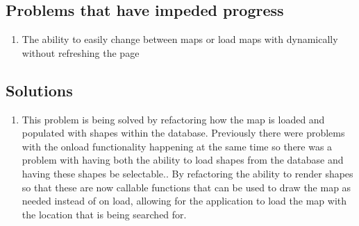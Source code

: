 \documentclass[letterpaper,10pt,titlepage, onecolumn, compsoc]{IEEEtran}
\begin{document}
\subsection{Problems that have impeded progress}
\begin{enumerate}
	\item The ability to easily change between maps or load maps with dynamically without refreshing the page
\end{enumerate}

\subsection{Solutions}
\begin{enumerate}
	\item This problem is being solved by refactoring how the map is loaded and populated with shapes within the database. Previously there were problems with the onload functionality happening at the same time so there was a problem with having both the ability to load shapes from the database and having these shapes be selectable.. By refactoring the ability to render shapes so that these are now callable functions that can be used to draw the map as needed instead of on load, allowing for the application to load the map with the location that is being searched for.
\end{enumerate}


\newpage
%
%
\end{document}
